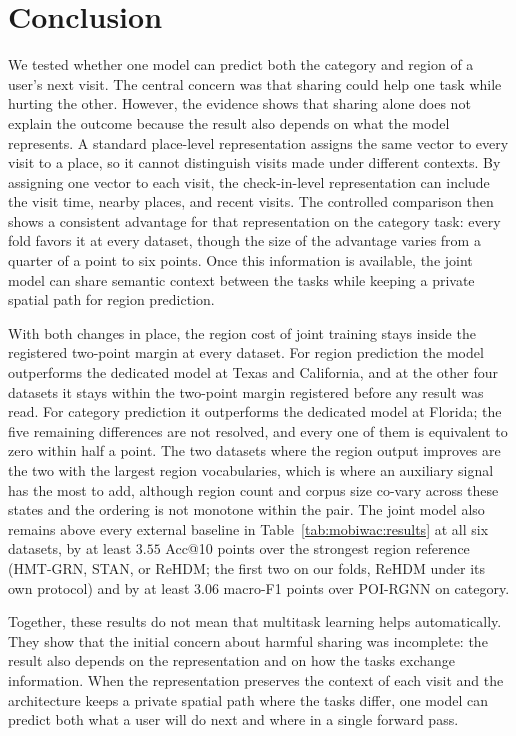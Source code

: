\section{Conclusion}
\label{sec:mobiwac:conclusion}

We tested whether one model can predict both the category and region of a user's next visit. The central concern was
that sharing could help one task while hurting the other. However, the evidence shows that sharing alone does not
explain the outcome because the result also depends on what the model represents. A standard place-level representation
assigns the same vector to every visit to a place, so it cannot distinguish visits made under different contexts. By
assigning one vector to each visit, the check-in-level representation can include the visit time, nearby places, and
recent visits. The controlled comparison then shows a consistent advantage for that representation on the category
task: every fold favors it at every dataset, though the size of the advantage varies from a quarter of a point to
six points. Once this information is available, the joint model can share
semantic context between the tasks while keeping a private spatial path for region prediction.

With both changes in place, the region cost of joint training stays inside the registered two-point
margin at every dataset. For region
prediction the model outperforms the dedicated model at Texas and California, and at the other four
datasets it stays within the two-point margin registered before any result was read. For category
prediction it outperforms the dedicated model at Florida; the five remaining differences are not
resolved, and every one of them is equivalent to zero within half a point. The two datasets where
the region output improves are the two with the largest region vocabularies, which is where an
auxiliary signal has the most to add, although region count and corpus size co-vary across these
states and the ordering is not monotone within the pair. The joint model also remains above every
external baseline in Table~\ref{tab:mobiwac:results} at all six datasets, by at least $3.55$ Acc@10
points over the strongest region reference (HMT-GRN, STAN, or ReHDM; the first two on our folds,
ReHDM under its own protocol) and by at least $3.06$ macro-F1 points over POI-RGNN on category.

Together, these results do not mean that multitask learning helps automatically. They show that the initial concern
about harmful sharing was incomplete: the result also depends on the representation and on how the tasks exchange
information. When the representation preserves the context of each visit and the architecture keeps a private spatial
path where the tasks differ, one model can predict both what a user will do next and where in a single forward pass.
